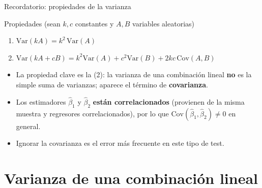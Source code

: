 \documentclass{beamer}
\begin{document}
\begin{frame}{Recordatorio: propiedades de la varianza}
\begin{block}{Propiedades (sean $k,c$ constantes y $A,B$ variables aleatorias)}
\begin{enumerate}
    \item $\text{Var}(kA) = k^2\,\text{Var}(A)$
    \item $\text{Var}(kA + cB) = k^2\text{Var}(A) + c^2\text{Var}(B) + 2kc\,\text{Cov}(A, B)$
\end{enumerate}
\end{block}
\pause
\begin{itemize}
    \item La propiedad clave es la (2): la varianza de una combinación lineal \textbf{no} es la simple suma de varianzas; aparece el término de \textbf{covarianza}.
    \item Los estimadores $\hat{\beta}_1$ y $\hat{\beta}_2$ \textbf{están correlacionados} (provienen de la misma muestra y regresores correlacionados), por lo que $\text{Cov}(\hat{\beta}_1,\hat{\beta}_2)\neq 0$ en general.
    \item Ignorar la covarianza es el error más frecuente en este tipo de test.
\end{itemize}
\end{frame}

\section{Varianza de una combinación lineal}
\end{document}
